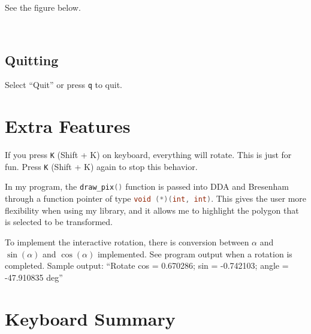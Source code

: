 \documentclass[11pt]{article}
\begin{document}
See the figure below. 

\


\subsection{Quitting}

Select ``Quit'' or press \lstinline{q} to quit. 

\section{Extra Features}

If you press \lstinline{K} (Shift + K) on keyboard, everything will rotate. This
 is just for fun. Press \lstinline{K} (Shift + K) again to stop this behavior. 

In my program, the \lstinline[language=c]{draw_pix()} function is passed into
 DDA and Bresenham through a function pointer of type
 \lstinline[language=c]{void (*)(int, int)}. This gives the user more
 flexibility when using my library, and it allows me to highlight the polygon
 that is selected to be transformed. 

To implement the interactive rotation, there is conversion between
 $\alpha$ and $\sin(\alpha)$ and $\cos(\alpha)$ implemented. See program output
 when a rotation is completed. Sample output:
 ``Rotate cos = 0.670286; sin = -0.742103; angle = -47.910835 deg''

\section{Keyboard Summary}
\end{document}
